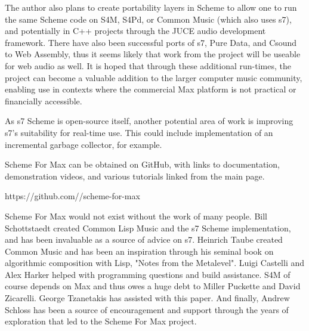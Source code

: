 \documentclass[acmsmall]{acmart}
\begin{document}
The author also plans to create portability layers in Scheme to allow one to run 
the same Scheme code on S4M, S4Pd, or Common Music (which also uses s7),
and potentially in C++ projects through the JUCE audio development framework.
There have also been successful ports of s7, Pure Data, and Csound to Web Assembly, 
thus it seems likely that work from the project will be useable for web audio as well.
It is hoped that through these additional run-times, the project can become 
a valuable addition to the larger computer music community, enabling
use in contexts where the commercial Max platform is not practical
or financially accessible.

As s7 Scheme is open-source itself, another potential area of work
is improving s7's suitability for real-time use. This could include
implementation of an incremental garbage collector, for example.

Scheme For Max can be obtained on GitHub, with links to documentation,
demonstration videos, and various tutorials linked from the main page.


https://github.com//scheme-for-max
\begin{acks}
Scheme For Max would not exist without the work of many people. 
Bill Schottstaedt created Common Lisp Music and the s7 Scheme implementation,
and has been invaluable as a source of advice on s7. Heinrich Taube
created Common Music and has been an inspiration through his seminal book
on algorithmic composition with Lisp, "Notes from the Metalevel".
Luigi Castelli and Alex Harker helped with programming questions
and build assistance. 
S4M of course depends on Max and thus owes a huge debt to 
Miller Puckette and David Zicarelli.
George Tzanetakis has assisted with this paper.
And finally, Andrew Schloss has
been a source of encouragement and support through the years of 
exploration that led to the Scheme For Max project.

\end{acks}




\end{document}
